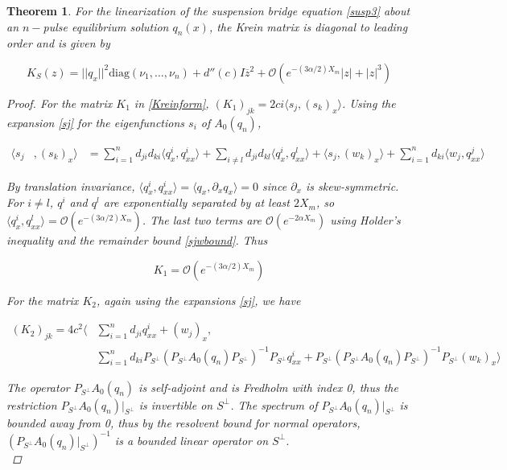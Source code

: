 \documentclass[12pt]{article}
\newtheorem{theorem}{Theorem}
\begin{document}
\begin{theorem}\label{Kreindiagdom}
For the linearization of the suspension bridge equation \eqref{susp3} about an $n-$pulse equilibrium solution $q_n(x)$, the Krein matrix is diagonal to leading order and is given by

\begin{equation}\label{Kreinapprox}
K_S(z) = ||q_x||^2 \text{diag}(\nu_1, \dots, \nu_n)
 + d''(c) I \overline{z}^2 + \mathcal{O}(e^{-(3 \alpha/2) X_m}|z| + |z|^3)
\end{equation}

\begin{proof}
For the matrix $K_1$ in \eqref{Kreinform}, $(K_1)_{jk} = 2 c i \langle s_j, (s_k)_x \rangle$. Using the expansion \eqref{sj} for the eigenfunctions $s_i$ of $A_0(q_n)$,

\begin{align}
\langle s_j &, (s_k)_x \rangle 
&= \sum_{i = 1}^{n} d_{ji} d_{ki} \langle q^i_x, q^i_{xx} \rangle 
+ \sum_{i \neq l} d_{ji} d_{kl} \langle q^i_x, q^l_{xx} \rangle 
+ \langle s_j, (w_k)_x \rangle 
+ \sum_{i = 1}^{n} d_{ki} \langle w_j, q^j_{xx} \rangle
\end{align}  

By translation invariance, $\langle q^i_x, q^i_{xx} \rangle = \langle q_x, \partial_x q_x \rangle = 0$ since $\partial_x$ is skew-symmetric. For $i \neq l$, $q^i$ and $q^l$ are exponentially separated by at least $2 X_m$, so $\langle q^i_x, q^l_{xx} \rangle = \mathcal{O}(e^{-(3 \alpha/2) X_m})$. The last two terms are $\mathcal{O}(e^{-2 \alpha X_m})$ using Holder's inequality and the remainder bound \eqref{sjwbound}. Thus 

\begin{equation}\label{K1final}
K_1 = \mathcal{O}(e^{-(3 \alpha/2) X_m})
\end{equation}

For the matrix $K_2$, again using the expansions \eqref{sj}, we have

\begin{align}\label{K2expansion}
(K_2)_{jk} 
= 4 c^2 \langle &\sum_{i = 1}^{n} d_{ji} q^i_{xx} + (w_j)_x, \\
&\sum_{i = 1}^{n} d_{ki} P_{S^\perp} (P_{S^\perp} A_0(q_n) P_{S^\perp})^{-1} P_{S^\perp} q^i_{xx} + P_{S^\perp} (P_{S^\perp} A_0(q_n) P_{S^\perp})^{-1} P_{S^\perp} (w_k)_x \rangle \nonumber 
\end{align}

The operator $P_{S^\perp} A_0(q_n)$ is self-adjoint and is Fredholm with index 0, thus the restriction $P_{S^\perp} A_0(q_n)|_{S^\perp}$ is invertible on $S^\perp$. The spectrum of $P_{S^\perp} A_0(q_n)|_{S^\perp}$ is bounded away from 0, thus by the resolvent bound for normal operators, $(P_{S^\perp} A_0(q_n)|_{S^\perp})^{-1}$ is a bounded linear operator on $S^\perp$. \\


\end{proof}
\end{theorem}
\end{document}
